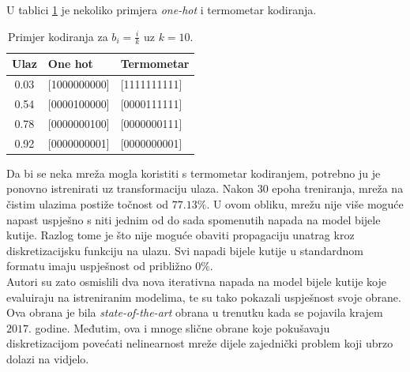 \documentclass[utf8, diplomski]{fer}
\begin{document}
U tablici \ref{example_encoding} je nekoliko primjera \textit{one-hot} i termometar kodiranja.
\begin{table}[H]
\centering
\begin{tabular}{@{}cll@{}}
\toprule
Ulaz & One hot & Termometar\\ \midrule
0.03 & [1000000000] & [1111111111] \\
0.54 & [0000100000] & [0000111111] \\ 
0.78 & [0000000100] & [0000000111] \\ 
0.92 & [0000000001] & [0000000001] \\ \bottomrule
\end{tabular}
\caption{Primjer kodiranja za $b_{i} = \frac{i}{k}$ uz $k = 10$.}\label{example_encoding}
\end{table}
\par
Da bi se neka mreža mogla koristiti s termometar kodiranjem, potrebno ju je ponovno istrenirati uz transformaciju ulaza. Nakon $30$ epoha treniranja, mreža na čistim ulazima postiže točnost od $77.13\%$. U ovom obliku, mrežu nije više moguće napast uspješno s niti jednim od do sada spomenutih napada na model bijele kutije. Razlog tome je što nije moguće obaviti propagaciju unatrag kroz diskretizacijsku funkciju na ulazu. Svi napadi bijele kutije u standardnom formatu imaju uspješnost od približno $0\%$. \\
Autori su zato osmislili dva nova iterativna napada na model bijele kutije koje evaluiraju na istreniranim modelima, te su tako pokazali uspješnost svoje obrane. Ova obrana je bila \textit{state-of-the-art} obrana u trenutku kada se pojavila krajem $2017.$ godine. Međutim, ova i mnoge slične obrane koje pokušavaju diskretizacijom povećati nelinearnost mreže dijele zajednički problem koji ubrzo dolazi na vidjelo.
\end{document}

